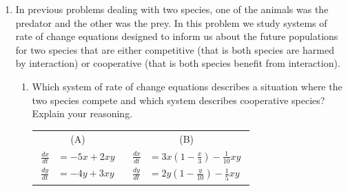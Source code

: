 \begin{enumerate}
\begin{enumerate*}
\end{enumerate*}
\begin{center}
\end{center}

\clearpage

\item In previous problems dealing with two species, one of the animals was the predator and the other was the prey. In this problem we study systems of rate of change equations designed to inform us about the future populations for two species that are either competitive (that is both species are harmed by interaction) or cooperative (that is both species benefit from interaction). \label{09HWproblem5}

\begin{enumerate}
\item Which system of rate of change equations describes a situation where the two species compete and which system describes cooperative species? Explain your reasoning. \label{09HWproblem5parta}
\begin{center}
\begin{tabular}{cc}
	 (A)	&	(B)	\\
$\displaystyle \begin{aligned} \frac{dx}{dt} &= -5x+2xy\\ \frac{dy}{dt} &= -4y+3xy \end{aligned}$ &$\displaystyle \begin{aligned} \frac{dx}{dt} &= 3x(1-\frac{x}{3})-\frac{1}{10}xy\\ \frac{dy}{dt} &= 2y(1-\frac{y}{10})-\frac{1}{5}xy \end{aligned}$ 
\end{tabular}
\end{center}


\end{enumerate}
\end{enumerate}
